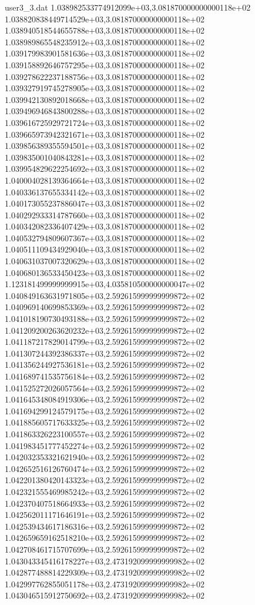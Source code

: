 \begin{filecontents}{user3_3.dat}
1.038982533774912099e+03,3.081870000000000118e+02
1.038820838449714529e+03,3.081870000000000118e+02
1.038940518544655788e+03,3.081870000000000118e+02
1.038989865548235912e+03,3.081870000000000118e+02
1.039179983901581636e+03,3.081870000000000118e+02
1.039158892646757295e+03,3.081870000000000118e+02
1.039278622237188756e+03,3.081870000000000118e+02
1.039327919745278905e+03,3.081870000000000118e+02
1.039942130892018668e+03,3.081870000000000118e+02
1.039496946843800288e+03,3.081870000000000118e+02
1.039616725929721724e+03,3.081870000000000118e+02
1.039665973942321671e+03,3.081870000000000118e+02
1.039856389355594501e+03,3.081870000000000118e+02
1.039835001040843281e+03,3.081870000000000118e+02
1.039954829622254692e+03,3.081870000000000118e+02
1.040004028139364664e+03,3.081870000000000118e+02
1.040336137655334142e+03,3.081870000000000118e+02
1.040173055237886047e+03,3.081870000000000118e+02
1.040292933314787660e+03,3.081870000000000118e+02
1.040342082336407429e+03,3.081870000000000118e+02
1.040532794809607367e+03,3.081870000000000118e+02
1.040511109434929040e+03,3.081870000000000118e+02
1.040631037007320629e+03,3.081870000000000118e+02
1.040680136533450423e+03,3.081870000000000118e+02
1.123181499999999915e+03,4.035810500000000047e+02
1.040849163631971805e+03,2.592615999999999872e+02
1.040969140699853369e+03,2.592615999999999872e+02
1.041018190730493188e+03,2.592615999999999872e+02
1.041209200263620232e+03,2.592615999999999872e+02
1.041187217829014799e+03,2.592615999999999872e+02
1.041307244392386337e+03,2.592615999999999872e+02
1.041356244927536181e+03,2.592615999999999872e+02
1.041689741535756184e+03,2.592615999999999872e+02
1.041525272026057564e+03,2.592615999999999872e+02
1.041645348084919306e+03,2.592615999999999872e+02
1.041694299124579175e+03,2.592615999999999872e+02
1.041885605717633325e+03,2.592615999999999872e+02
1.041863326223100557e+03,2.592615999999999872e+02
1.041983451777452274e+03,2.592615999999999872e+02
1.042032353321621940e+03,2.592615999999999872e+02
1.042652516126760474e+03,2.592615999999999872e+02
1.042201380420143323e+03,2.592615999999999872e+02
1.042321555469985242e+03,2.592615999999999872e+02
1.042370407518664933e+03,2.592615999999999872e+02
1.042562011171646191e+03,2.592615999999999872e+02
1.042539434617186316e+03,2.592615999999999872e+02
1.042659659162518210e+03,2.592615999999999872e+02
1.042708461715707699e+03,2.592615999999999872e+02
1.043043345416178227e+03,2.473192099999999982e+02
1.042877488814229309e+03,2.473192099999999982e+02
1.042997762855051178e+03,2.473192099999999982e+02
1.043046515912750692e+03,2.473192099999999982e+02

\end{filecontents}
